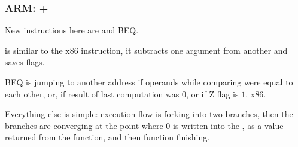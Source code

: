 \subsubsection{ARM: \OptimizingKeil + \ThumbMode}



{New instructions here are \CMP and \ac{BEQ}.}

\CMP {}
{is similar to the x86 instruction, it subtracts one argument from another and saves flags.}

\ac{BEQ} 
{is jumping to another address if operands while comparing were equal to each other, or,
if result of last computation was $0$, or if Z flag is $1$.}
 x86.

{Everything else is simple: execution flow is forking into two branches, then the branches are 
converging at the point
where $0$ is written into the \Rzero, as a value returned from the function, and then function finishing.}

